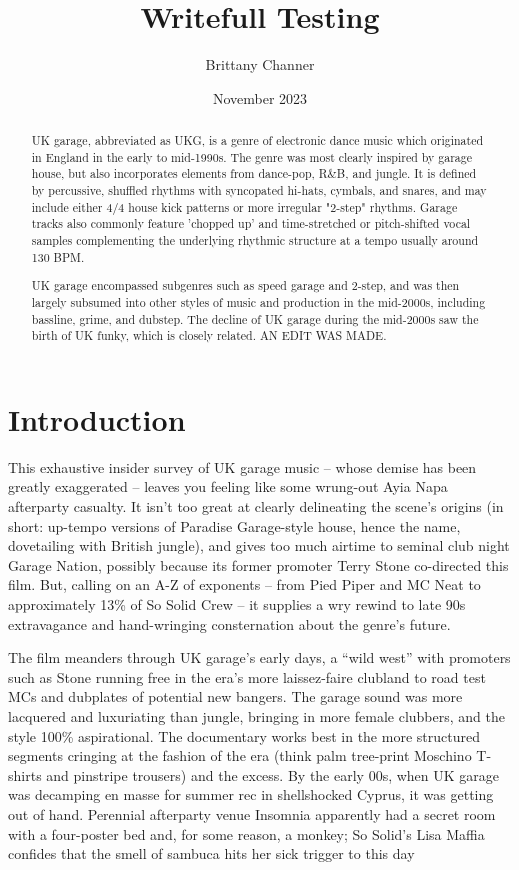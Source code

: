 \documentclass{article}
\title{Writefull Testing}
\author{Brittany Channer}
\date{November 2023}
\begin{document}
\maketitle
\begin{abstract}
    UK garage, abbreviated as UKG, is a genre of electronic dance music which originated in England in the early to mid-1990s. The genre was most clearly inspired by garage house, but also incorporates elements from dance-pop, R\&B, and jungle. It is defined by percussive, shuffled rhythms with syncopated hi-hats, cymbals, and snares, and may include either 4/4 house kick patterns or more irregular "2-step" rhythms. Garage tracks also commonly feature 'chopped up' and time-stretched or pitch-shifted vocal samples complementing the underlying rhythmic structure at a tempo usually around 130 BPM. 

UK garage encompassed subgenres such as speed garage and 2-step, and was then largely subsumed into other styles of music and production in the mid-2000s, including bassline, grime, and dubstep. The decline of UK garage during the mid-2000s saw the birth of UK funky, which is closely related. AN EDIT WAS MADE.
\end{abstract}

\section{Introduction}

This exhaustive insider survey of UK garage music – whose demise has been greatly exaggerated – leaves you feeling like some wrung-out Ayia Napa afterparty casualty. It isn’t too great at clearly delineating the scene’s origins (in short: up-tempo versions of Paradise Garage-style house, hence the name, dovetailing with British jungle), and gives too much airtime to seminal club night Garage Nation, possibly because its former promoter Terry Stone co-directed this film. But, calling on an A-Z of exponents – from Pied Piper and MC Neat to approximately 13\% of So Solid Crew – it supplies a wry rewind to late 90s extravagance and hand-wringing consternation about the genre’s future.

The film meanders through UK garage’s early days, a “wild west” with promoters such as Stone running free in the era’s more laissez-faire clubland to road test MCs and dubplates of potential new bangers. The garage sound was more lacquered and luxuriating than jungle, bringing in more female clubbers, and the style 100\% aspirational. The documentary works best in the more structured segments cringing at the fashion of the era (think palm tree-print Moschino T-shirts and pinstripe trousers) and the excess. By the early 00s, when UK garage was decamping en masse for summer rec in shellshocked Cyprus, it was getting out of hand. Perennial afterparty venue Insomnia apparently had a secret room with a four-poster bed and, for some reason, a monkey; So Solid’s Lisa Maffia confides that the smell of sambuca hits her sick trigger to this day
\end{document}
